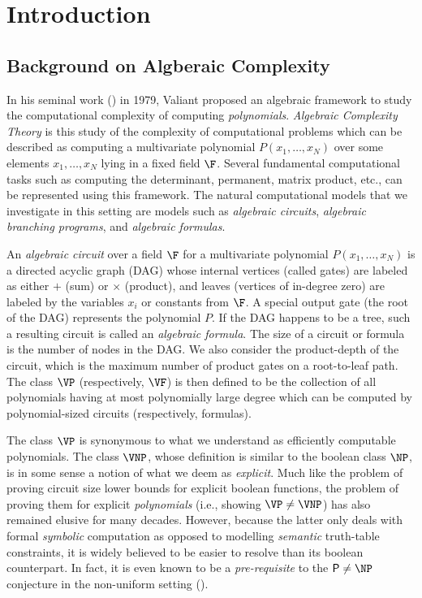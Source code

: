 \documentclass{article}
\begin{document}
\newpage
\section{Introduction}
\subsection{Background on Algberaic Complexity}

In his seminal work (\cite{Val79}) in 1979, Valiant proposed an algebraic framework to study the computational complexity of computing \emph{polynomials}. \emph{Algebraic Complexity Theory} is this study of the complexity of computational problems which can be described as computing a multivariate polynomial $P(x_1,\ldots,x_N)$ over some elements $x_1,\ldots,x_N$ lying in a fixed field $\F$. Several fundamental computational tasks such as computing the determinant, permanent, matrix product, etc., can be represented using this framework. The natural computational models that we investigate in this setting are models such as \emph{algebraic circuits}, \emph{algebraic branching programs}, and \emph{algebraic formulas}. 

An \emph{algebraic circuit} over a field $\F$ for a multivariate polynomial $P(x_1,\ldots,x_N)$ is a directed acyclic graph (DAG)
whose internal vertices (called gates) are labeled as either $+$ (sum) or $\times$ (product), and leaves
(vertices of in-degree zero) are labeled by the variables $x_i$ or constants from $\F$. 
A special output gate (the root of the DAG) represents the polynomial
$P$. 
If the DAG happens to be a tree, such a resulting circuit is called an \emph{algebraic formula}. 
The size of a circuit or formula is the number of nodes in the DAG. We also consider the product-depth of the circuit, which is the maximum number of product gates on a root-to-leaf path. 
The class $\VP$ (respectively, $\VF$) is then defined to be the collection of all polynomials having at most polynomially large degree which can be computed by polynomial-sized circuits (respectively, formulas).

The class $\VP$ is synonymous to what we understand as efficiently computable polynomials. The class $\VNP$, whose definition is similar to the boolean class $\NP$, is in some sense a notion of what we deem as \emph{explicit}. Much like the problem of proving circuit size lower bounds for {explicit} boolean functions, the problem of proving them for explicit \emph{polynomials} (i.e., showing $\VP\neq \VNP$) has also remained elusive for many decades. However, because the latter only deals with {formal} \emph{symbolic} computation as opposed to modelling \emph{semantic} truth-table constraints, it is widely believed to be easier to resolve than its boolean counterpart. In fact, it is even known to be a \emph{pre-requisite} to the $\mathsf{P}\neq \NP$ conjecture in the non-uniform setting (\cite{burg}).
\end{document}
